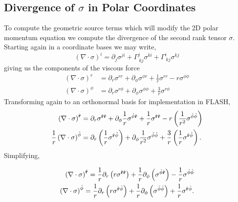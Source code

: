 \subsection{Divergence of $\sigma$ in Polar Coordinates}
To compute the geometric source terms which will modify the 2D polar momentum equation we compute the divergence of the second rank tensor $\sigma$. Starting again in a coordinate bases we may write,
\begin{equation}
\left( \nabla \cdot \sigma \right)^i = \partial_j \sigma^{ji} + \Gamma^j_{\ kj} \sigma^{ki} + \Gamma^i_{\ kj} \sigma^{kj}
\end{equation}
giving us the components of the viscous force
\begin{align}
\left( \nabla \cdot \sigma \right)^r &=  \partial_r \sigma^{rr} + \partial_{\phi} \sigma^{\phi r} + \frac{1}{r}\sigma^{rr} - r\sigma^{\phi \phi} \nonumber \\
\left( \nabla \cdot \sigma \right)^{\phi} &=  \partial_r \sigma^{r\phi} + \partial_{\phi} \sigma^{\phi \phi} + \frac{3}{r}\sigma^{r \phi} \nonumber
\end{align}
Transforming again to an orthonormal basis for implementation in FLASH,
\begin{align}
\left( \nabla \cdot \sigma \right)^{\hat {\bf r}} &=  \partial_r \sigma^{\hat {\bf r} \hat {\bf r}} + \partial_{\phi}  \frac{1}{r}\sigma^{{\hat{\phi}} \hat {\bf r}} + \frac{1}{r}\sigma^{\hat {\bf r} \hat {\bf r}} - r \left( \frac{1}{r^2} \sigma^{{\hat{\phi}} {\hat{\phi}}} \right) \nonumber \\
\frac{1}{r}\left( \nabla \cdot \sigma \right)^{{\hat{\phi}}} &=  \partial_r  \left( \frac{1}{r}\sigma^{\hat {\bf r} {\hat{\phi}}} \right) + \partial_{\phi}  \frac{1}{r^2} \sigma^{{\hat{\phi}} {\hat{\phi}}} + \frac{3}{r}  \left( \frac{1}{r} \sigma^{\hat {\bf r} {\hat{\phi}}}\right) \nonumber.
\end{align}
Simplifying,
\begin{center}
\begin{align}
\left( \nabla \cdot \sigma \right)^{\hat {\bf r}} =  \frac{1}{r} \partial_r \left( r \sigma^{\hat {\bf r} \hat {\bf r}} \right) + \frac{1}{r}\partial_{\phi} \left( \sigma^{{\hat{\phi}} \hat {\bf r}} \right) - \frac{1}{r} \sigma^{{\hat{\phi}} {\hat{\phi}}}  \nonumber \\
\left( \nabla \cdot \sigma \right)^{{\hat{\phi}}} = \frac{1}{r} \partial_r \left( r \sigma^{\hat {\bf r} {\hat{\phi}}} \right) + \frac{1}{r}\partial_{\phi} \left( \sigma^{{\hat{\phi}} {\hat{\phi}}} \right)+ \frac{1}{r} \sigma^{\hat {\bf r} {\hat{\phi}}}    .
\label{NonAngDiv}
\end{align}
\end{center}
